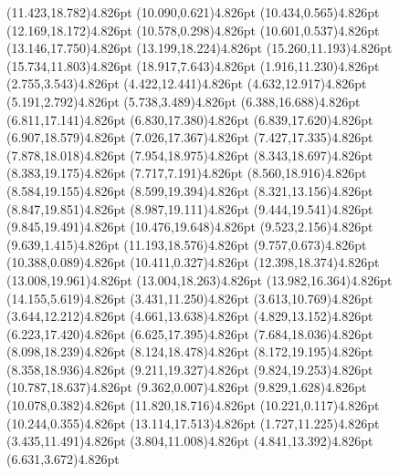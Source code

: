 \documentclass[10pt]{article}
\begin{document}
{{\qdisk(11.423,18.782){4.826pt}%
\qdisk(10.090,0.621){4.826pt}%
\qdisk(10.434,0.565){4.826pt}%
\qdisk(12.169,18.172){4.826pt}%
\qdisk(10.578,0.298){4.826pt}%
\qdisk(10.601,0.537){4.826pt}%
\qdisk(13.146,17.750){4.826pt}%
\qdisk(13.199,18.224){4.826pt}%
\qdisk(15.260,11.193){4.826pt}%
\qdisk(15.734,11.803){4.826pt}%
\qdisk(18.917,7.643){4.826pt}%
\dummycolor
\qdisk(1.916,11.230){4.826pt}%
\qdisk(2.755,3.543){4.826pt}%
\qdisk(4.422,12.441){4.826pt}%
\qdisk(4.632,12.917){4.826pt}%
\qdisk(5.191,2.792){4.826pt}%
\qdisk(5.738,3.489){4.826pt}%
\qdisk(6.388,16.688){4.826pt}%
\qdisk(6.811,17.141){4.826pt}%
\qdisk(6.830,17.380){4.826pt}%
\qdisk(6.839,17.620){4.826pt}%
\qdisk(6.907,18.579){4.826pt}%
\qdisk(7.026,17.367){4.826pt}%
\qdisk(7.427,17.335){4.826pt}%
\qdisk(7.878,18.018){4.826pt}%
\qdisk(7.954,18.975){4.826pt}%
\qdisk(8.343,18.697){4.826pt}%
\qdisk(8.383,19.175){4.826pt}%
\qdisk(7.717,7.191){4.826pt}%
\qdisk(8.560,18.916){4.826pt}%
\qdisk(8.584,19.155){4.826pt}%
\qdisk(8.599,19.394){4.826pt}%
\qdisk(8.321,13.156){4.826pt}%
\qdisk(8.847,19.851){4.826pt}%
\qdisk(8.987,19.111){4.826pt}%
\qdisk(9.444,19.541){4.826pt}%
\qdisk(9.845,19.491){4.826pt}%
\qdisk(10.476,19.648){4.826pt}%
\qdisk(9.523,2.156){4.826pt}%
\qdisk(9.639,1.415){4.826pt}%
\qdisk(11.193,18.576){4.826pt}%
\qdisk(9.757,0.673){4.826pt}%
\qdisk(10.388,0.089){4.826pt}%
\qdisk(10.411,0.327){4.826pt}%
\qdisk(12.398,18.374){4.826pt}%
\qdisk(13.008,19.961){4.826pt}%
\qdisk(13.004,18.263){4.826pt}%
\qdisk(13.982,16.364){4.826pt}%
\qdisk(14.155,5.619){4.826pt}%
\dummycolor
\qdisk(3.431,11.250){4.826pt}%
\qdisk(3.613,10.769){4.826pt}%
\qdisk(3.644,12.212){4.826pt}%
\qdisk(4.661,13.638){4.826pt}%
\qdisk(4.829,13.152){4.826pt}%
\qdisk(6.223,17.420){4.826pt}%
\qdisk(6.625,17.395){4.826pt}%
\qdisk(7.684,18.036){4.826pt}%
\qdisk(8.098,18.239){4.826pt}%
\qdisk(8.124,18.478){4.826pt}%
\qdisk(8.172,19.195){4.826pt}%
\qdisk(8.358,18.936){4.826pt}%
\qdisk(9.211,19.327){4.826pt}%
\qdisk(9.824,19.253){4.826pt}%
\qdisk(10.787,18.637){4.826pt}%
\qdisk(9.362,0.007){4.826pt}%
\qdisk(9.829,1.628){4.826pt}%
\qdisk(10.078,0.382){4.826pt}%
\qdisk(11.820,18.716){4.826pt}%
\qdisk(10.221,0.117){4.826pt}%
\qdisk(10.244,0.355){4.826pt}%
\qdisk(13.114,17.513){4.826pt}%
\dummycolor
\qdisk(1.727,11.225){4.826pt}%
\qdisk(3.435,11.491){4.826pt}%
\qdisk(3.804,11.008){4.826pt}%
\qdisk(4.841,13.392){4.826pt}%
\qdisk(6.631,3.672){4.826pt}%
}}
\end{document}

